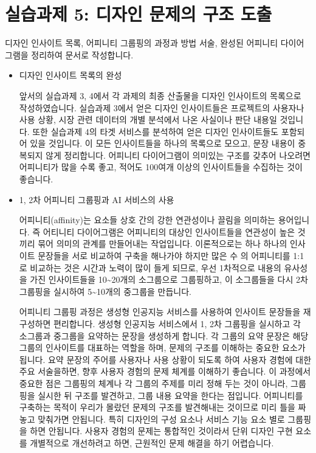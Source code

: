 \documentclass[
  letterpaper,
]{book}
\begin{document}
\section{실습과제 5: 디자인 문제의 구조
도출}\label{uxc2e4uxc2b5uxacfcuxc81c-5-uxb514uxc790uxc778-uxbb38uxc81cuxc758-uxad6cuxc870-uxb3c4uxcd9c}

디자인 인사이트 목록, 어피니티 그룹핑의 과정과 방법 서술, 완성된
어피니티 다이어그램을 정리하여 문서로 작성합니다.

\begin{itemize}
\item
  디자인 인사이트 목록의 완성

  앞서의 실습과제 3, 4에서 각 과제의 최종 산출물을 디자인 인사이트의
  목록으로 작성하였습니다. 실습과제 3에서 얻은 디자인 인사이트들은
  프로젝트의 사용자나 사용 상황, 시장 관련 데이터의 개별 분석에서 나온
  사실이나 판단 내용일 것입니다. 또한 실습과제 4의 타겟 서비스를
  분석하여 얻은 디자인 인사이트들도 포함되어 있을 것입니다. 이 모든
  인사이트들을 하나의 목록으로 모으고, 문장 내용이 중복되지 않게
  정리합니다. 어피니티 다이어그램이 의미있는 구조를 갖추어 나오려면
  어피니티가 많을 수록 좋고, 적어도 100여개 이상의 인사이트들을 수집하는
  것이 좋습니다.
\item
  1, 2차 어피니티 그룹핑과 AI 서비스의 사용

  어피니티(affinity)는 요소들 상호 간의 강한 연관성이나 끌림을 의미하는
  용어입니다. 즉 어티니티 다이어그램은 어피니티의 대상인 인사이트들을
  연관성이 높은 것끼리 묶어 의미의 관계를 만들어내는 작업입니다.
  이론적으로는 하나 하나의 인사이트 문장들을 서로 비교하여 구축을
  해나가야 하지만 많은 수 의 어피니티를 1:1로 비교하는 것은 시간과
  노력이 많이 들게 되므로, 우선 1차적으로 내용의 유사성을 가진
  인사이트들을 10\textasciitilde20개의 소그룹으로 그룹핑하고, 이
  소그룹들을 다시 2차 그룹핑을 실시하여 5\textasciitilde10개의 중그룹을
  만듭니다.

  어피니티 그룹핑 과정은 생성형 인공지능 서비스를 사용하여 인사이트
  문장들을 재구성하면 편리합니다. 생성형 인공지능 서비스에서 1, 2차
  그룹핑을 실시하고 각 소그룹과 중그룹을 요약하는 문장을 생성하게
  합니다. 각 그룹의 요약 문장은 해당 그룹의 인사이트를 대표하는 역할을
  하며, 문제의 구조를 이해하는 중요한 요소가 됩니다. 요약 문장의 주어를
  사용자나 사용 상황이 되도록 하여 사용자 경험에 대한 주요 서술을하면,
  향후 사용자 경험의 문제 체계를 이해하기 좋습니다. 이 과정에서 중요한
  점은 그룹핑의 체계나 각 그룹의 주제를 미리 정해 두는 것이 아니라,
  그룹핑을 실시한 뒤 구조를 발견하고, 그룹 내용 요약을 한다는 점입니다.
  어피니티를 구축하는 목적이 우리가 몰랐던 문제의 구조를 발견해내는
  것이므로 미리 틀을 짜놓고 맞춰가면 안됩니다. 특히 디자인의 구성 요소나
  서비스 기능 요소 별로 그룹핑을 하면 안됩니다. 사용자 경험의 문제는
  통합적인 것이라서 단위 디자인 구현 요소를 개별적으로 개선하려고 하면,
  근원적인 문제 해결을 하기 어렵습니다.


\end{itemize}
\end{document}

